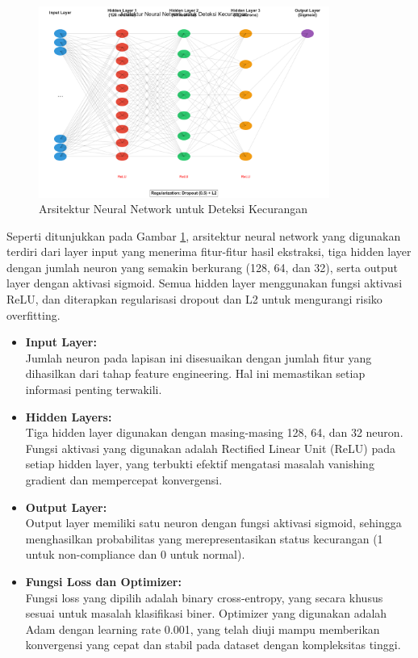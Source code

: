 \begin{figure}[htbp]
    \centering
    \includegraphics[width=0.85\textwidth]{figures/neural_network_architecture.pdf}
    \caption{Arsitektur Neural Network untuk Deteksi Kecurangan}
    \label{fig:neural_network}
\end{figure}

Seperti ditunjukkan pada Gambar \ref{fig:neural_network}, arsitektur neural network yang digunakan terdiri dari layer input yang menerima fitur-fitur hasil ekstraksi, tiga hidden layer dengan jumlah neuron yang semakin berkurang (128, 64, dan 32), serta output layer dengan aktivasi sigmoid. Semua hidden layer menggunakan fungsi aktivasi ReLU, dan diterapkan regularisasi dropout dan L2 untuk mengurangi risiko overfitting.

\begin{itemize}
    \item \textbf{Input Layer:}\\
    Jumlah neuron pada lapisan ini disesuaikan dengan jumlah fitur yang dihasilkan dari tahap feature engineering. Hal ini memastikan setiap informasi penting terwakili.
    
    \item \textbf{Hidden Layers:}\\
    Tiga hidden layer digunakan dengan masing-masing 128, 64, dan 32 neuron. Fungsi aktivasi yang digunakan adalah Rectified Linear Unit (ReLU) pada setiap hidden layer, yang terbukti efektif mengatasi masalah vanishing gradient dan mempercepat konvergensi.
    
    \item \textbf{Output Layer:}\\
    Output layer memiliki satu neuron dengan fungsi aktivasi sigmoid, sehingga menghasilkan probabilitas yang merepresentasikan status kecurangan (1 untuk non-compliance dan 0 untuk normal).
    
    \item \textbf{Fungsi Loss dan Optimizer:}\\
    Fungsi loss yang dipilih adalah binary cross-entropy, yang secara khusus sesuai untuk masalah klasifikasi biner. Optimizer yang digunakan adalah Adam dengan learning rate 0.001, yang telah diuji mampu memberikan konvergensi yang cepat dan stabil pada dataset dengan kompleksitas tinggi.
\end{itemize}

